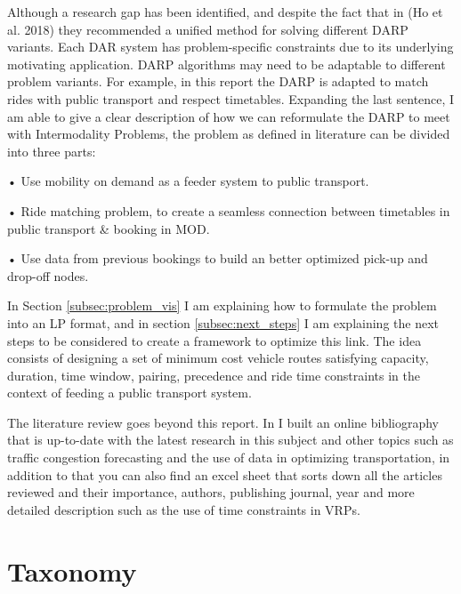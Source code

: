 \documentclass{article}
\begin{document}
Although a research gap has been identified, and despite the fact that in (Ho et al. 2018) \cite{HO_darp2018} they recommended a unified method for solving different DARP variants. 
Each DAR system has problem-specific constraints due to its underlying motivating application. DARP algorithms may need to be adaptable to different problem variants. For example, in this report the DARP is adapted to match rides with public transport and 
respect timetables.
\label{subsec:reformulate_problem}
Expanding the last sentence, I am able to give a clear description of how we can reformulate the DARP to meet with Intermodality Problems, the problem as defined in literature can be divided into three parts:
\begin{list}{}
\item • Use mobility on demand as a feeder system to public transport.
\item • Ride matching problem, to create a seamless connection between timetables in public transport \& booking in MOD.
\item • Use data from previous bookings to build an better optimized pick-up and drop-off nodes.
\end{list}

In Section \ref{subsec:problem_vis} I am explaining how to formulate the problem into an LP format, and in section \ref{subsec:next_steps} I am explaining the next steps to be considered to create a framework to optimize this link. The idea consists of designing a set of minimum cost vehicle routes satisfying capacity, duration, time window, pairing, precedence and ride time constraints in the context of feeding a public transport system.


The literature review goes beyond this report. In \cite{my_bibliography} I built an online bibliography that is up-to-date with the latest research in this subject and other topics such as traffic congestion forecasting and the use of data in optimizing transportation, in addition to that you can also find an excel sheet that sorts down all the articles reviewed and their importance, authors, publishing journal, year and more detailed description such as the use of time constraints in VRPs.


\section{Taxonomy}
\label{sec:taxonomy}
\end{document}
